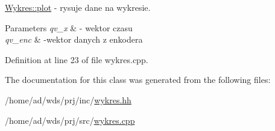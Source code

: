 \hyperlink{class_wykres_a5733ec2d1bef2b52cb8fe1022336d14d}{Wykres\+::plot} -\/ rysuje dane na wykresie. 


\begin{DoxyParams}{Parameters}
{\em qv\+\_\+x} & -\/ wektor czasu \\
\hline
{\em qv\+\_\+enc} & -\/wektor danych z enkodera \\
\hline
\end{DoxyParams}


Definition at line 23 of file wykres.\+cpp.



The documentation for this class was generated from the following files\+:\begin{DoxyCompactItemize}
\item 
/home/ad/wds/prj/inc/\hyperlink{wykres_8hh}{wykres.\+hh}\item 
/home/ad/wds/prj/src/\hyperlink{wykres_8cpp}{wykres.\+cpp}\end{DoxyCompactItemize}
